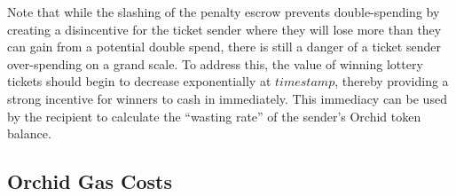 Note that while the slashing of the penalty escrow prevents double-spending by creating a disincentive for the ticket sender where they will lose more than they can gain from a potential double spend, there is still a danger of a ticket sender over-spending on a grand scale. To address this, the value of winning lottery tickets should begin to decrease exponentially at $timestamp$, thereby providing a strong incentive for winners to cash in immediately. This immediacy can be used by the recipient to calculate the ``wasting rate'' of the sender's Orchid token balance.

\begin{comment}
\begin{quote}
	\color{red}
    \texttt{Completely unfinished. Here for example sake currently,}
\end{quote}
\begin{algorithm}[H]
  \SetKwInOut{Input}{Let}

  \Input{Alice $\gets$ PubK, \{Nodes\}}
  \Input{Bob is a Node}
    \textbf{Handshake}:\\
    ~~Alice: Bob $\gets$ msg\{I would like to buy bandwidth\}\\
    ~~Bob:~~Chris $\gets$ msg\{Verify sufficient funds from Alice at time $t$ with rate $r$\}\\
    ~~~~~~~~~~Alice $\gets$ msg\{Agree to sell bandwidth\}\\
    ~~~~~~~~~~Alice $\gets$ h :  h = Hash($N$), for some $N \in \{0,1\}^k$, $k \in \mathbb{Z}$\\
    \textbf{Post-Handshake:}\\
    ~~Alice: Determine,\\
    ~~~~~~~~~$t$, $v$, $p$ : $t$ = time stamp, $v$ = value of ticket, $p$ = probability of win\\
    ~~~~~~~~~$\alpha$ : $\alpha (t, v, p)$ = Sig(PubK, \{$t, v, p, n$, h\}), where $n \in \{0,1\}^k$\\
    ~~Alice: Bob $\gets$ $\alpha$\\
    ~~Bob: \While{Alice is using bandwidth}{
    	Simulate the ticket winning condition with smart contract $\omega$ using $\alpha$ and $N$
    }
    ~~~~~~~~Chris $\gets$ $N, \alpha$
\caption{Ticket Protocol}
\end{algorithm}
\end{comment}

\subsection{Orchid Gas Costs}

